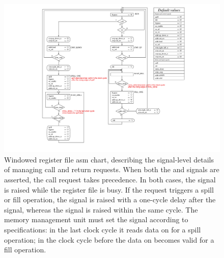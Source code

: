 \begin{figure}
    \centering
    \includegraphics[width=\textwidth]{fig/windowed_rf/windowed_rf_cu.pdf}
    \caption{Windowed register file \acs{asm} chart, describing the signal-level details of managing call and return requests. When both the  and  signals are asserted, the call request takes precedence. In both cases, the  signal is raised while the register file is busy. If the request triggers a spill or fill operation, the  signal is raised with a one-cycle delay after the  signal, whereas the  signal is raised within the same cycle. The memory management unit must set the  signal according to specifications: in the last clock cycle it reads data on  for a spill operation; in the clock cycle before the data on  becomes valid for a fill operation.}
    \label{fig:wrf_asm}
\end{figure}

